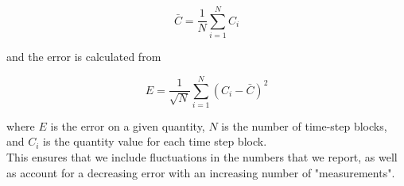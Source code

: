 \documentclass{article}
\begin{document}
\begin{multicols}{2}
\begin{equation}
\bar{C} = \frac{1}{N}\sum \limits _{i=1}^N C_i 
\end{equation}

\noindent and the error is calculated from 

\begin{equation}
E = \frac{1}{\sqrt{N}}\sum \limits _{i=1}^N (C_i - \bar{C})^2
\end{equation}

\noindent where $E$ is the error on a given quantity, $N$ is the number of time-step blocks, and $C_i$ is the quantity value for each time step block.\\

This ensures that we include fluctuations in the numbers that we report, as well as account for a decreasing error with an increasing number of "measurements".  


\end{multicols}




  
\end{document}
